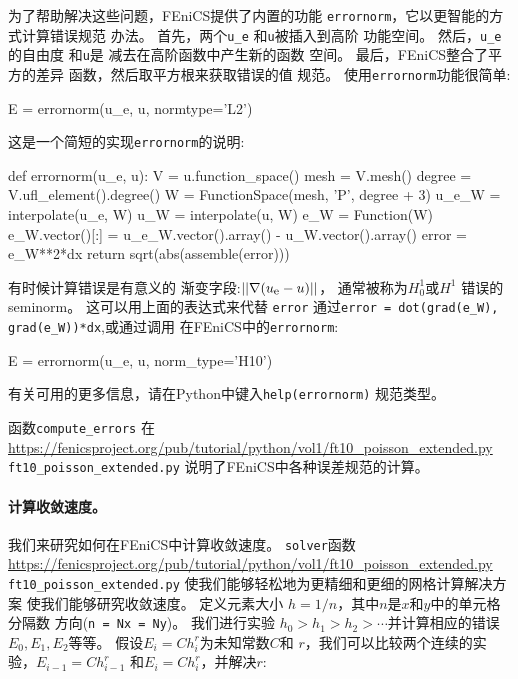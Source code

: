 为了帮助解决这些问题，FEniCS提供了内置的功能
\texttt{errornorm}，它以更智能的方式计算错误规范
办法。 首先，两个\verb!u_e! 和\texttt{u}被插入到高阶
功能空间。 然后，\verb!u_e!的自由度 和\texttt{u}是
减去在高阶函数中产生新的函数
空间。 最后，FEniCS整合了平方的差异
函数，然后取平方根来获取错误的值
规范。 使用\texttt{errornorm}功能很简单:

\begin{python}
E = errornorm(u_e, u, normtype='L2')
\end{python}
这是一个简短的实现\texttt{errornorm}的说明:

\begin{python}
def errornorm(u_e, u):
    V = u.function_space()
    mesh = V.mesh()
    degree = V.ufl_element().degree()
    W = FunctionSpace(mesh, 'P', degree + 3)
    u_e_W = interpolate(u_e, W)
    u_W = interpolate(u, W)
    e_W = Function(W)
    e_W.vector()[:] = u_e_W.vector().array() - u_W.vector().array()
    error = e_W**2*dx
    return sqrt(abs(assemble(error)))
\end{python}

有时候计算错误是有意义的
渐变字段:$||\nabla(\uex-u)||$，
通常被称为$H^1_0$或$H^1$
错误的seminorm。
这可以用上面的表达式来代替
\texttt{error} 通过\verb!error = dot(grad(e_W), grad(e_W))*dx!,或通过调用
在FEniCS中的\texttt{errornorm}:

\begin{python}
E = errornorm(u_e, u, norm_type='H10')
\end{python}
有关可用的更多信息，请在Python中键入\texttt{help(errornorm)}
规范类型。

函数\verb!compute_errors! 在
\url{https://fenicsproject.org/pub/tutorial/python/vol1/ft10_poisson_extended.py} {\nolinkurl{ft10_poisson_extended.py}}
说明了FEniCS中各种误差规范的计算。

\paragraph{计算收敛速度。}
我们来研究如何在FEniCS中计算收敛速度。
\texttt{solver}函数
\url{https://fenicsproject.org/pub/tutorial/python/vol1/ft10_poisson_extended.py} {\nolinkurl{ft10_poisson_extended.py}}
使我们能够轻松地为更精细和更细的网格计算解决方案
使我们能够研究收敛速度。 定义元素大小
$h=1/n$，其中$n$是$x$和$y$中的单元格分隔数
方向(\texttt{n = Nx = Ny})。 我们进行实验
$h_0>h_1>h_2>\cdots$并计算相应的错误$E_0, E_1,
E_2$等等。 假设$E_i=Ch_i^r$为未知常数$C$和
$r$，我们可以比较两个连续的实验，$E_{i-1}=Ch_{i-1}^r$
和$E_i=Ch_i^r$，并解决$r$:

